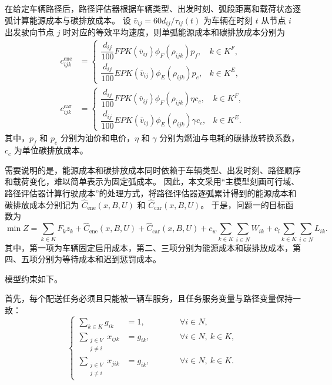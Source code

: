 \documentclass[withoutpreface,bwprint]{cumcmthesis} %
\begin{document}
在给定车辆路径后，路径评估器根据车辆类型、出发时刻、弧段距离和载荷状态逐弧计算能源成本与碳排放成本。
设
$\bar v_{ij}=60d_{ij}/\tau_{ij}(t)$
为车辆在时刻 $t$ 从节点 $i$ 出发驶向节点 $j$ 时对应的等效平均速度，则单弧能源成本和碳排放成本分别为
\begin{equation}
\begin{aligned}
c_{ijk}^{\mathrm{ene}}
&=
\begin{cases}
\dfrac{d_{ij}}{100}FPK(\bar v_{ij})\phi_F(\rho_{ijk})p_f,
& k\in K^F,\\[6pt]
\dfrac{d_{ij}}{100}EPK(\bar v_{ij})\phi_E(\rho_{ijk})p_e,
& k\in K^E,
\end{cases}\\
c_{ijk}^{\mathrm{car}}
&=
\begin{cases}
\dfrac{d_{ij}}{100}FPK(\bar v_{ij})\phi_F(\rho_{ijk})\eta c_c,
& k\in K^F,\\[6pt]
\dfrac{d_{ij}}{100}EPK(\bar v_{ij})\phi_E(\rho_{ijk})\gamma c_c,
& k\in K^E.
\end{cases}
\end{aligned}
\label{eq:arc_cost}
\end{equation}
其中，$p_f$ 和 $p_e$ 分别为油价和电价，$\eta$ 和 $\gamma$ 分别为燃油与电耗的碳排放转换系数，$c_c$ 为单位碳排放成本。

需要说明的是，能源成本和碳排放成本同时依赖于车辆类型、出发时刻、路径顺序和载荷变化，难以简单表示为固定弧成本。
因此，本文采用“主模型刻画可行域、路径评估器计算行驶成本”的处理方式，将路径评估器逐弧累计得到的能源成本和碳排放成本分别记为
$\widehat C_{\mathrm{ene}}(x,B,U)$ 和 $\widehat C_{\mathrm{car}}(x,B,U)$。
于是，问题一的目标函数为
\begin{equation}
\min Z=
\sum_{k\in K}F_k z_k
+\widehat C_{\mathrm{ene}}(x,B,U)
+\widehat C_{\mathrm{car}}(x,B,U)
+c_w\sum_{k\in K}\sum_{i\in N}W_{ik}
+c_l\sum_{k\in K}\sum_{i\in N}L_{ik}.
\label{eq:objective}
\end{equation}
其中，第一项为车辆固定启用成本，第二、三项分别为能源成本和碳排放成本，第四、五项分别为等待成本和迟到惩罚成本。

模型约束如下。

首先，每个配送任务必须且只能被一辆车服务，且任务服务变量与路径变量保持一致：
\begin{equation}
\left\{
\begin{alignedat}{2}
\sum_{k\in K}g_{ik} &=1,
&\qquad& \forall i\in N,\\
\sum_{\substack{j\in V\\j\ne i}}x_{ijk} &=g_{ik},
&& \forall i\in N,\ k\in K,\\
\sum_{\substack{j\in V\\j\ne i}}x_{jik} &=g_{ik},
&& \forall i\in N,\ k\in K.
\end{alignedat}
\right.
\label{eq:service_flow}
\end{equation}
\end{document}
